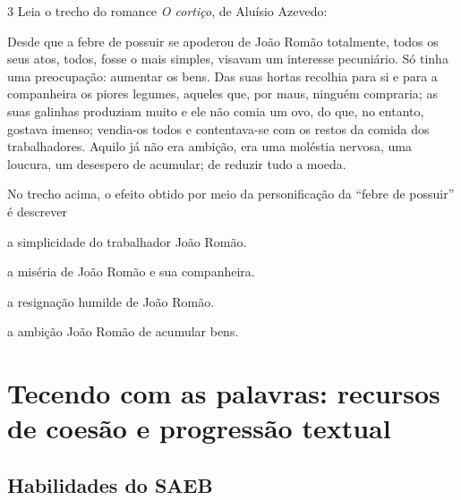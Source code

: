 \num{3} Leia o trecho do romance \textit{O cortiço}, de Aluísio Azevedo:



\begin{myquote}

Desde que a febre de possuir se apoderou de João Romão totalmente, todos os seus atos, todos, 
fosse o mais simples, visavam um interesse pecuniário. Só tinha uma preocupação: aumentar 
os bens. Das suas hortas recolhia para si e para a companheira os piores legumes, aqueles que,
por maus, ninguém compraria; as suas galinhas produziam muito e ele não comia um ovo, do que, 
no entanto, gostava imenso; vendia-os todos e contentava-se com os restos da comida dos 
trabalhadores. Aquilo já não era ambição, era uma moléstia nervosa, uma loucura, um desespero
de acumular; de reduzir tudo a moeda.


\end{myquote}

No trecho acima, o efeito obtido por meio da personificação da ``febre de possuir'' é descrever

\begin{escolha}
  
  \item a simplicidade do trabalhador João Romão. 
  
  \item a miséria de João Romão e sua companheira.
  
  \item a resignação humilde de João Romão. 
  
  \item a ambição João Romão de acumular bens. 

\end{escolha}


\chapter{Tecendo com as palavras: recursos de coesão e progressão textual}

\section*{Habilidades do SAEB}

